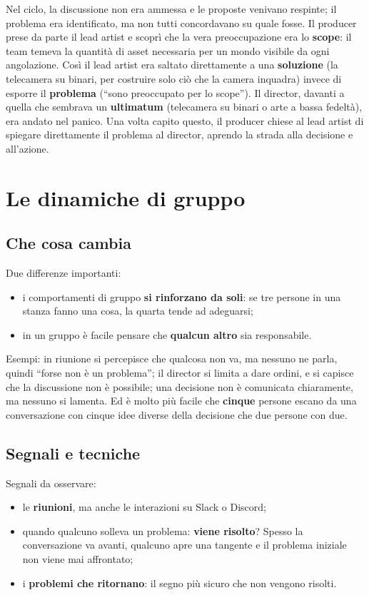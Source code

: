 Nel ciclo, la discussione non era ammessa e le proposte venivano respinte; il
problema era identificato, ma non tutti concordavano su quale fosse. Il producer
prese da parte il lead artist e scoprì che la vera preoccupazione era lo
\textbf{scope}: il team temeva la quantità di asset necessaria per un mondo
visibile da ogni angolazione. Così il lead artist era saltato direttamente a una
\textbf{soluzione} (la telecamera su binari, per costruire solo ciò che la camera
inquadra) invece di esporre il \textbf{problema} (``sono preoccupato per lo
scope''). Il director, davanti a quella che sembrava un \textbf{ultimatum}
(telecamera su binari o arte a bassa fedeltà), era andato nel panico. Una volta
capito questo, il producer chiese al lead artist di spiegare direttamente il
problema al director, aprendo la strada alla decisione e all'azione.

\section{Le dinamiche di gruppo}
\label{sec:c3-3-gruppo}

\subsection{Che cosa cambia}

Due differenze importanti:
\begin{itemize}
  \item i comportamenti di gruppo \textbf{si rinforzano da soli}: se tre persone in
        una stanza fanno una cosa, la quarta tende ad adeguarsi;
  \item in un gruppo è facile pensare che \textbf{qualcun altro} sia responsabile.
\end{itemize}
Esempi: in riunione si percepisce che qualcosa non va, ma nessuno ne parla, quindi
``forse non è un problema''; il director si limita a dare ordini, e si capisce che
la discussione non è possibile; una decisione non è comunicata chiaramente, ma
nessuno si lamenta. Ed è molto più facile che \textbf{cinque} persone escano da una
conversazione con cinque idee diverse della decisione che due persone con due.

\subsection{Segnali e tecniche}

Segnali da osservare:
\begin{itemize}
  \item le \textbf{riunioni}, ma anche le interazioni su Slack o Discord;
  \item quando qualcuno solleva un problema: \textbf{viene risolto}? Spesso la
        conversazione va avanti, qualcuno apre una tangente e il problema iniziale
        non viene mai affrontato;
  \item i \textbf{problemi che ritornano}: il segno più sicuro che non vengono
        risolti.
\end{itemize}

